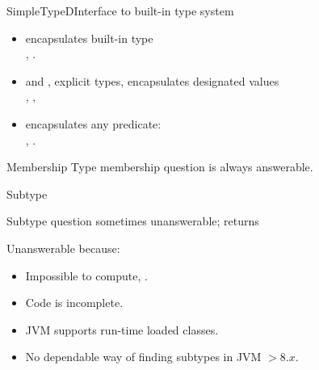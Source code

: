 \begin{frame}{SimpleTypeD}{Interface to built-in type system}
  
  \begin{itemize}
  \item {} encapsulates built-in type \\
    \eg, .
  \item {} and , explicit types, encapsulates designated values\\
    \eg, , 
  \item {} encapsulates any predicate: \\
    \eg, .
  \end{itemize}
\end{frame}


\newsavebox\membershipbox
\begin{lrbox}{\membershipbox}
  \begin{minipage}{11cm}
    
  \end{minipage}
\end{lrbox}

\begin{frame}{Membership}
  Type membership question is always answerable.

  \usebox\membershipbox
\end{frame}

\newsavebox\subtypebox
\begin{lrbox}{\subtypebox}
  \begin{minipage}{11cm}

  \end{minipage}
\end{lrbox}



\begin{frame}{Subtype}

  Subtype question sometimes unanswerable;  returns 

  \usebox\subtypebox

  Unanswerable because:
  \begin{itemize}
  \item Impossible to compute, \eg {}.
  \item Code is incomplete.
  \item JVM supports run-time loaded classes.
  \item No dependable way of finding subtypes in JVM $> 8.x$.
  \end{itemize}

\end{frame}
